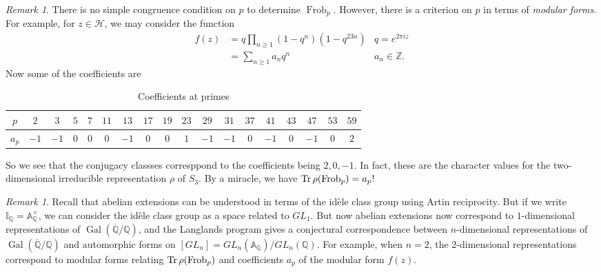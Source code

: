 \documentclass[leqno, openany]{memoir}
\theoremstyle{definition}
\theoremstyle{remark}
\newtheorem{rmk}[thm]{Remark}
\theoremstyle{plain}
\theoremstyle{definition}
\theoremstyle{remark}
\newcommand{\A}{\mathbb{A}}
\newcommand{\Z}{\mathbb{Z}}
\newcommand{\Q}{\mathbb{Q}}
\newcommand{\I}{\mathbb{I}}
\newcommand{\mc}[1]{\mathcal{#1}}
\newcommand{\ol}[1]{\overline{#1}}
\DeclareMathOperator{\Gal}{Gal}
\DeclareMathOperator{\Frob}{Frob}
\begin{document}
\begin{rmk} There is no simple congruence condition on $p$ to determine
    $\Frob_p$. However, there is a criterion on $p$ in terms of \textit{modular
    forms}. For example, for $z \in \mc{H}$, we may consider the function
    \begin{align*} f(z) &= q \prod_{n \geq 1} (1-q^n) (1-q^{23 n}) &q = e^{2
        \pi i z} \\ &= \sum_{n \geq 1} a_n q^n &a_n \in \Z.  \end{align*} Now
            some of the coefficients are \begin{table}[H] \centering
                \caption{Coefficients at primes} \label{tab:label}
                \begin{tabular}{cccccccccccccccccc} \toprule $p$ & $2$ & $3$ &
                    $5$ & $7$ & $11$ & $13$ & $17$ & $19$ & $23$ & $29$ & $31$
                        & $37$ & $41$ & $43$ & $47$ & $53$ & $59$ \\ \midrule
                $a_p$ & $-1$ & $-1$ & $0$ & $0$ & $0$ & $-1$ & $0$ & $0$ & $1$
                      & $-1$ & $-1$ & $0$ & $-1$ & $0$ & $-1$ & $0$ & $2$ \\
                  \bottomrule \end{tabular} \end{table} So we see that the
                  conjugacy classses corresppond to the coefficients being $2,
                  0, -1$. In fact, these are the character values for the
                  two-dimensional irreducible representation $\rho$ of $S_3$.
                  By a miracle, we have $\Tr \rho(\Frob_p) = a_p$!  \end{rmk}

\begin{rmk} Recall that abelian extensions can be understood in terms of the
    id\`ele class group using Artin reciprocity. But if we write $\I_{\Q} =
    \A_{\Q}^{\times}$, we can consider the id\`ele class group as a space
    related to $GL_1$. But now abelian extensions now correspond to
    $1$-dimensional representations of $\Gal(\ol{\Q}/\Q)$, and the Langlands
    program gives a conjectural correspondence between $n$-dimensional
    representations of $\Gal(\ol{\Q}/\Q)$ and automorphic forms on $[GL_n] =
    GL_n(\A_{\Q}) / GL_n(\Q)$. For example, when $n=2$, the $2$-dimensional
    representations correspond to modular forms relating $\Tr \rho(\Frob_p)$
    and coefficients $a_p$ of the modular form $f(z)$.  \end{rmk}
\end{document}
